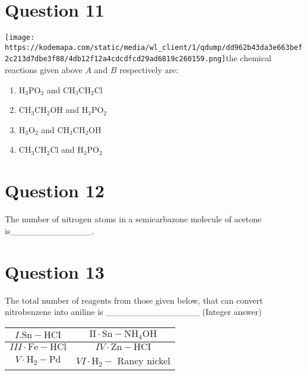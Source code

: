 \documentclass{article}
\begin{document}
\section*{Question 11}
\texttt{[image: https://kodemapa.com/static/media/wl\_client/1/qdump/dd962b43da3e663bef2c213d7dbe3f88/4db12f12a4cdcdfcd29ad6819c260159.png]}\newlineIn the chemical reactions given above \(A\) and \(B\) respectively are: 
\begin{enumerate}[label=(\alph*)]
\item \(\mathrm{H}_3 \mathrm{PO}_2\) and \(\mathrm{CH}_3 \mathrm{CH}_2 \mathrm{Cl}\)
\item \(\mathrm{CH}_3 \mathrm{CH}_2 \mathrm{OH}\) and \(\mathrm{H}_3 \mathrm{PO}_2\)
\item \(\mathrm{H}_3 \mathrm{O}_2\) and \(\mathrm{CH}_3 \mathrm{CH}_2 \mathrm{OH}\)
\item \(\mathrm{CH}_3 \mathrm{CH}_2 \mathrm{Cl}\) and \(\mathrm{H}_3 \mathrm{PO}_2\)
\end{enumerate}
\newpage
\section*{Question 12}
The number of nitrogen atoms in a semicarbazone molecule of acetone is_____________.
\begin{enumerate}[label=(\alph*)]
\end{enumerate}
\newpage
\section*{Question 13}
The total number of reagents from those given below, that can convert nitrobenzene into aniline is _______________ (Integer answer)
    \setlength{\arrayrulewidth}{1mm}
    \begin{tabular}{|c|c|}
    \hline
    \(I . \mathrm{Sn}-\mathrm{HCI}\) & \(\mathrm{II} \cdot \mathrm{Sn}-\mathrm{NH}_4 \mathrm{OH}\) \\
\hline
\(I I I \cdot \mathrm{Fe}-\mathrm{HCl}\) & \(I V \cdot \mathrm{Zn}-\mathrm{HCI}\) \\
\hline
\(V \cdot \mathrm{H}_2-\mathrm{Pd}\) & \(V I \cdot \mathrm{H}_2-\) Raney nickel \\
\hline

    \end{tabular}
    \setlength{\arrayrulewidth}{0.4mm}
    
\begin{enumerate}[label=(\alph*)]
\end{enumerate}
\newpage
\end{document}
